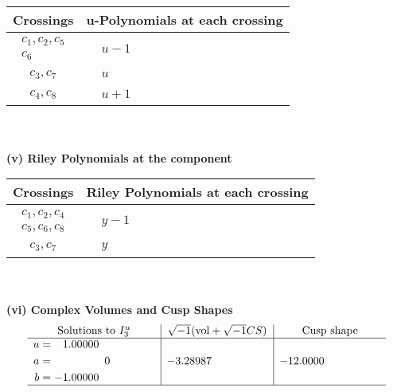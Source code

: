 \documentclass[1p]{elsarticle_modified}
\theoremstyle{definition}
\newcommand{\I}{\sqrt{-1}}
\begin{document}
\begin{tabular}{m{50pt}|m{274pt}}
Crossings & \hspace{64pt}u-Polynomials at each crossing \\
\hline $$\begin{aligned}c_{1},c_{2},c_{5}\\c_{6}\end{aligned}$$&$\begin{aligned}
&u-1
\end{aligned}$\\
\hline $$\begin{aligned}c_{3},c_{7}\end{aligned}$$&$\begin{aligned}
&u
\end{aligned}$\\
\hline $$\begin{aligned}c_{4},c_{8}\end{aligned}$$&$\begin{aligned}
&u+1
\end{aligned}$\\
\hline
\end{tabular}\\~\\
\newpage\renewcommand{\arraystretch}{1}
\flushleft \textbf{(v) Riley Polynomials at the component}\newline \\
\begin{tabular}{m{50pt}|m{274pt}}
Crossings & \hspace{64pt}Riley Polynomials at each crossing \\
\hline $$\begin{aligned}c_{1},c_{2},c_{4}\\c_{5},c_{6},c_{8}\end{aligned}$$&$\begin{aligned}
&y-1
\end{aligned}$\\
\hline $$\begin{aligned}c_{3},c_{7}\end{aligned}$$&$\begin{aligned}
&y
\end{aligned}$\\
\hline
\end{tabular}\\~\\
\newpage\flushleft \textbf{(vi) Complex Volumes and Cusp Shapes}
$$\begin{array}{c|c|c}  
\text{Solutions to }I^u_{3}& \I (\text{vol} + \sqrt{-1}CS) & \text{Cusp shape}\\
 \hline 
\begin{aligned}
u &= \phantom{-}1.00000\phantom{ +0.000000I} \\
a &= \phantom{-0.000000 } 0 \\
b &= -1.00000\phantom{ +0.000000I}\end{aligned}
 & -3.28987\phantom{ +0.000000I} & -12.0000\phantom{ +0.000000I}\\
 \hline 
 \end{array}$$\newpage
\end{document}
